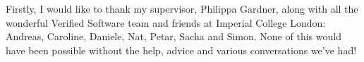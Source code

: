 Firstly, I would like to thank my supervisor, Philippa Gardner, along with all the wonderful Verified Software team and friends at Imperial College London: Andreas, Caroline, Daniele, Nat, Petar, Sacha and Simon. None of this would have been possible without the help, advice and various conversations we've had!